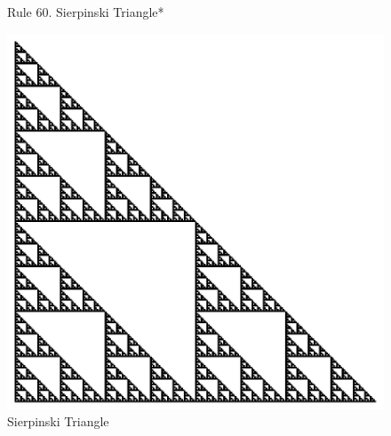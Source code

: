 \documentclass{beamer}
\begin{document}
\begin{frame}
\begin{figure}
        \caption{Rule 60. Sierpinski Triangle*}
    \end{figure}
\end{frame}


\begin{frame}
    \begin{figure}
        \includegraphics[scale=0.5]{GlobalMod2.pdf}
        \caption{Sierpinski Triangle}
    \end{figure}
\end{frame}

\end{document}
